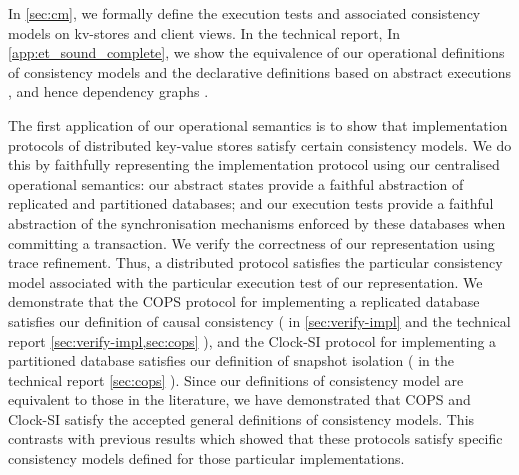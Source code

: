 In \cref{sec:cm}, we formally define the  execution tests and 
associated consistency models on kv-stores and client views. 
\ifTechRepEdits%
In the technical report,
\else%
In \cref{app:et_sound_complete},
\fi
we show the equivalence of our operational definitions of consistency
models and 
the declarative definitions  based on abstract executions \cite{framework-concur},
and hence dependency graphs \cite{adya}. 



The first application of our operational
semantics is to show that  implementation protocols  of distributed
key-value stores satisfy certain consistency models. We do this by
faithfully representing the implementation protocol using our centralised
operational semantics: our abstract states provide a faithful abstraction of replicated and partitioned
databases; and our execution tests provide a faithful abstraction of the synchronisation mechanisms 
enforced by these databases when committing a transaction. 
We  verify the correctness of our representation 
using trace refinement. Thus, a distributed protocol
satisfies  the particular consistency model associated with the
particular execution
test of our representation. 
We demonstrate that the COPS protocol \citep{cops} for implementing
a replicated database satisfies our definition of causal consistency (%
\ifTechRepEdits%
in \cref{sec:verify-impl} and the technical report%
\else%
\cref{sec:verify-impl,sec:cops}%
\fi%
), and the Clock-SI protocol \citep{clocksi} for implementing a
partitioned database satisfies our definition of snapshot isolation (%
\ifTechRepEdits%
in the technical report%
\else%
\cref{sec:cops}%
\fi%
).  Since our definitions of consistency model are equivalent to those
in the literature, we have demonstrated that COPS and Clock-SI satisfy
the accepted general definitions of consistency models. This contrasts
with 
previous results which showed that these protocols satisfy specific
consistency models  defined for those
particular implementations.


